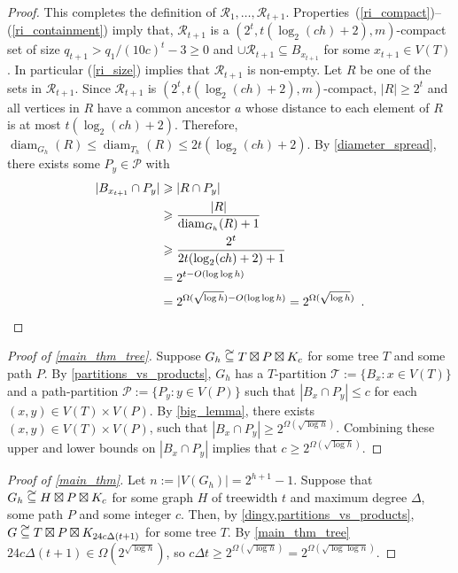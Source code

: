 \documentclass{patmorin}
\DeclareMathOperator{\diam}{diam}
\newcommand\subsetcong{\mathrel{\text{%
    \setbox0\hbox{$\subseteq$}%
    \rlap{\hbox to \wd0{\hss\hss\hss\raisebox{1.5\height}{$\sim$}\hss}}\box0
}}}
\renewcommand{\le}{\leqslant}
\renewcommand{\ge}{\geqslant}
\begin{document}
\begin{proof}
  This completes the definition of $\mathcal{R}_1,\ldots,\mathcal{R}_{t+1}$. Properties~(\ref{ri_compact})--(\ref{ri_containment}) imply that, $\mathcal{R}_{t+1}$ is a $(2^t,t(\log_2(ch)+2),m)$-compact set of size $q_{t+1} > q_1/(10c)^t-3 \ge 0$ and $\cup\mathcal{R}_{t+1}\subseteq B_{x_{t+1}}$ for some $x_{t+1}\in V(T)$.  In particular (\ref{ri_size}) implies that $\mathcal{R}_{t+1}$ is non-empty. Let $R$ be one of the sets in $\mathcal{R}_{t+1}$.  Since $\mathcal{R}_{t+1}$ is $(2^t,t(\log_2(ch)+2),m)$-compact, $|R|\ge 2^t$ and all vertices in $R$ have a common ancestor $a$ whose distance to each element of $R$ is at most $t(\log_2(ch)+2)$.  Therefore, $\diam_{G_h}(R)\le\diam_{T_h}(R)\le 2t(\log_2(ch)+2)$. By \cref{diameter_spread}, there exists some $P_y\in\mathcal{P}$ with
  \begin{align*}
    |B_{x_{t+1}}\cap P_y|
    & \ge |R\cap P_y| \\
    & \ge \frac{|R|}{\diam_{G_h}(R)+1} \\
    & \ge \frac{2^t}{2t(\log_2(ch)+2)+1} \\
    & = 2^{t-O(\log\log h)} \\
    & = 2^{\Omega(\sqrt{\log h})-O(\log\log h)}
   = 2^{\Omega(\sqrt{\log h})} \enspace . \qedhere
  \end{align*}
\end{proof}

\begin{proof}[Proof of \cref{main_thm_tree}]
  Suppose $G_h\subsetcong T\boxtimes P\boxtimes K_c$ for some tree $T$ and some path $P$.  By \cref{partitions_vs_products}, $G_h$ has a $T$-partition $\mathcal{T}:=\{B_x:x\in V(T)\}$ and a path-partition $\mathcal{P}:=\{P_y:y\in V(P)\}$ such that $|B_x\cap P_y|\le c$ for each $(x,y)\in V(T)\times V(P)$.  By \cref{big_lemma}, there exists $(x,y)\in V(T)\times V(P)$, such that $|B_x\cap P_y| \ge 2^{\Omega(\sqrt{\log h})}$.  Combining these upper and lower bounds on $|B_x\cap P_y|$ implies that $c\ge 2^{\Omega(\sqrt{\log h})}$.
\end{proof}

\begin{proof}[Proof of \cref{main_thm}]
  Let $n:=|V(G_h)|=2^{h+1}-1$.  Suppose that $G_h\subsetcong H\boxtimes P\boxtimes K_c$ for some graph $H$ of treewidth $t$ and maximum degree $\Delta$, some path $P$ and some integer $c$.  Then, by \cref{dingy,partitions_vs_products}, $G\subsetcong T\boxtimes P\boxtimes K_{24 c \Delta (t+1)}$ for some tree $T$.  By \cref{main_thm_tree} $24 c \Delta (t+1) \in \Omega(2^{\sqrt{\log h}})$, so $c\Delta t \ge 2^{\Omega(\sqrt{\log h})} = 2^{\Omega(\sqrt{\log\log n})}$.
\end{proof}
\end{document}
